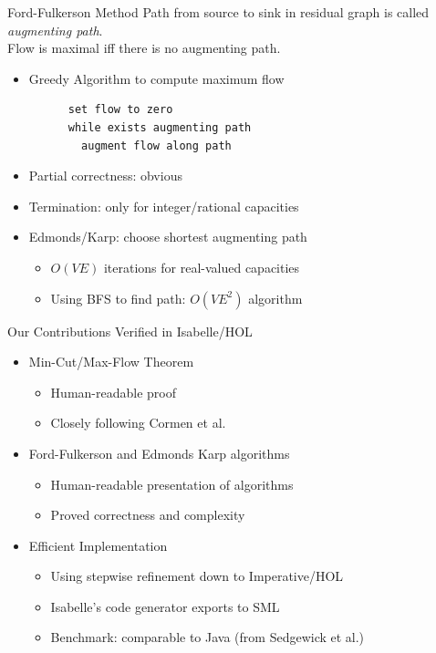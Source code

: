 \documentclass[fleqn]{beamer}
\begin{document}
\begin{frame}[fragile]{Ford-Fulkerson Method}
  {}
  {\small{
    Path from source to sink in residual graph is called \emph{augmenting path}.\\
    Flow is maximal iff there is no augmenting path.
  }}
  \vfill

  \begin{itemize}
   \item<+-> Greedy Algorithm to compute maximum flow
    \begin{lstlisting}
      set flow to zero
      while exists augmenting path
        augment flow along path
    \end{lstlisting}%
   \item<+-> Partial correctness: obvious
   \item<+-> Termination: only for integer/rational capacities
   \item<+-> Edmonds/Karp: choose shortest augmenting path
    \begin{itemize}
     \item $O(VE)$ iterations for real-valued capacities
     \item Using BFS to find path: $O(VE^2)$ algorithm

    \end{itemize}
  \end{itemize}
\end{frame}
\begin{frame}{Our Contributions}
  {Verified in Isabelle/HOL}

  \begin{itemize}
   \item<+-> Min-Cut/Max-Flow Theorem
    \begin{itemize}
     \item Human-readable proof
     \item Closely following Cormen et al.
    \end{itemize}
   \item<+-> Ford-Fulkerson and Edmonds Karp algorithms
    \begin{itemize}
     \item Human-readable presentation of algorithms
     \item Proved correctness and complexity
    \end{itemize}
   \item<+-> Efficient Implementation
    \begin{itemize}
     \item Using stepwise refinement down to Imperative/HOL
     \item Isabelle's code generator exports to SML
     \item Benchmark: comparable to Java (from Sedgewick et al.)

    \end{itemize}
  \end{itemize}
\end{frame}
\newcommand{\augment}{{\mathbin\uparrow}}%
\end{document}
